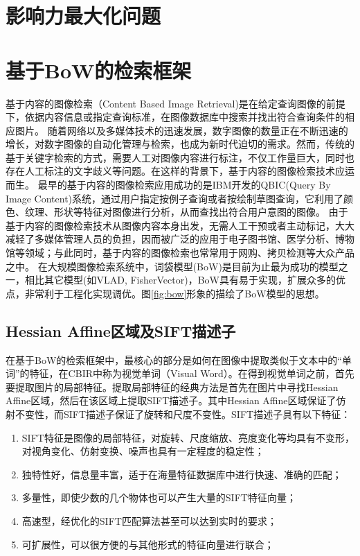 \section{影响力最大化问题}

\section{基于BoW的检索框架}
基于内容的图像检索（Content Based Image Retrieval)是在给定查询图像的前提下，依据内容信息或指定查询标准，在图像数据库中搜索并找出符合查询条件的相应图片\cite{cyy2007img}。 
随着网络以及多媒体技术的迅速发展，数字图像的数量正在不断迅速的增长，对数字图像的自动化管理与检索，也成为新时代迫切的需求。然而，传统的基于关键字检索的方式，需要人工对图像内容进行标注，不仅工作量巨大，同时也存在人工标注的文字歧义等问题。在这样的背景下，基于内容的图像检索技术应运而生。
最早的基于内容的图像检索应用成功的是IBM开发的QBIC\cite{qbic}(Query By Image Content)系统，通过用户指定按例子查询或者按绘制草图查询，它利用了颜色、纹理、形状等特征对图像进行分析，从而查找出符合用户意图的图像。
由于基于内容的图像检索技术从图像内容本身出发，无需人工干预或者主动标记，大大减轻了多媒体管理人员的负担，因而被广泛的应用于电子图书馆、医学分析、博物馆等领域；与此同时，基于内容的图像检索也常常用于网购、拷贝检测等大众产品之中。
在大规模图像检索系统中，词袋模型(BoW)是目前为止最为成功的模型之一\cite{arandjelovic2012three}，相比其它模型(如VLAD\cite{jegou2010aggregating}, FisherVector\cite{perronnin2007fisher})，BoW具有易于实现，扩展众多的优点，非常利于工程化实现调优。图\ref{fig:bow}形象的描绘了BoW模型的思想。

\subsection{Hessian Affine区域及SIFT描述子}
在基于BoW的检索框架中，最核心的部分是如何在图像中提取类似于文本中的“单词”的特征，在CBIR中称为视觉单词（Visual Word）。在得到视觉单词之前，首先要提取图片的局部特征。提取局部特征的经典方法是首先在图片中寻找Hessian Affine区域\cite{mikolajczyk2004scale}，然后在该区域上提取SIFT\cite{lowe2004distinctive}描述子。其中Hessian Affine区域保证了仿射不变性，而SIFT描述子保证了旋转和尺度不变性。SIFT描述子具有以下特征：
\begin{enumerate}
	\item SIFT特征是图像的局部特征，对旋转、尺度缩放、亮度变化等均具有不变形，对视角变化、仿射变换、噪声也具有一定程度的稳定性；
	\item 独特性好，信息量丰富，适于在海量特征数据库中进行快速、准确的匹配；
	\item 多量性，即使少数的几个物体也可以产生大量的SIFT特征向量；
	\item 高速型，经优化的SIFT匹配算法甚至可以达到实时的要求；
	\item 可扩展性，可以很方便的与其他形式的特征向量进行联合；
\end{enumerate}

